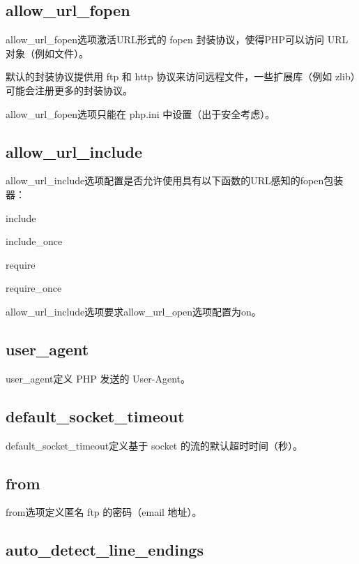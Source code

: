 \subsection{allow\_url\_fopen}


allow\_url\_fopen选项激活URL形式的 fopen 封装协议，使得PHP可以访问 URL 对象（例如文件）。

默认的封装协议提供用 ftp 和 http 协议来访问远程文件，一些扩展库（例如 zlib）可能会注册更多的封装协议。

allow\_url\_fopen选项只能在 php.ini 中设置（出于安全考虑）。

\subsection{allow\_url\_include}

allow\_url\_include选项配置是否允许使用具有以下函数的URL感知的fopen包装器：

\begin{compactitem}
\item include
\item include\_once
\item require
\item require\_once
\end{compactitem}

allow\_url\_include选项要求allow\_url\_open选项配置为on。

\subsection{user\_agent}


user\_agent定义 PHP 发送的 User-Agent。

\subsection{default\_socket\_timeout}

default\_socket\_timeout定义基于 socket 的流的默认超时时间（秒）。

\subsection{from}

from选项定义匿名 ftp 的密码（email 地址）。

\subsection{auto\_detect\_line\_endings}

